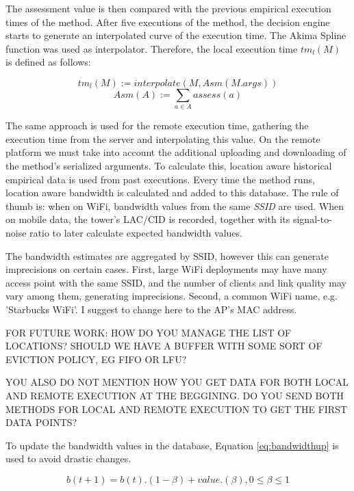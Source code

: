 \documentclass[10pt, conference, letterpaper]{IEEEtran}
\begin{document}
  The assessment value is then compared with the previous empirical execution times of the method. After five executions of the method, the decision engine starts to generate an interpolated curve of the execution time. The Akima Spline function was used as interpolator. Therefore, the local execution time $tm_{l}(M)$ is defined as follows:

  \begin{equation} \label{eq:timelocal}
    tm_{l}(M) := interpolate(M, Asm(M.args))
  \end{equation}
  \begin{equation}
    Asm(A) := \sum_{a \in A} assess(a)
  \end{equation}

The same approach is used for the remote execution time, gathering the execution time from the server and interpolating this value. On the remote platform we must take into account the additional uploading and downloading of the method's serialized arguments. To calculate this, location aware historical empirical data is used from past executions. Every time the method runs, location aware bandwidth is calculated and added to this database. The rule of thumb is: when on WiFi, bandwidth values from the same \textit{SSID} are used. When on mobile data, the tower's LAC/CID is recorded, together with its signal-to-noise ratio to later calculate expected bandwidth values.


{\color{red}
The bandwidth estimates are aggregated by SSID, however this can generate imprecisions on certain cases. First, large WiFi deployments may have many access point with the same SSID, and the number of clients and link quality may vary among them, generating imprecisions. Second, a common WiFi name, e.g. 'Starbucks WiFi'. I suggest to change here to the AP's MAC address.

FOR FUTURE WORK: HOW DO YOU MANAGE THE LIST OF LOCATIONS? SHOULD WE HAVE A BUFFER WITH SOME SORT OF EVICTION POLICY, EG FIFO OR LFU?

YOU ALSO DO NOT MENTION HOW YOU GET DATA FOR BOTH LOCAL AND REMOTE EXECUTION AT THE BEGGINING. DO YOU SEND BOTH METHODS FOR LOCAL AND REMOTE EXECUTION TO GET THE FIRST DATA POINTS?}

 To update the bandwidth values in the database, Equation \ref{eq:bandwidthup} is used to avoid drastic changes.

  \begin{equation} \label{eq:bandwidthup}
    b(t+1) = b(t) . (1-\beta) + value . (\beta), 0 \leq \beta \leq 1
  \end{equation}
\end{document}
